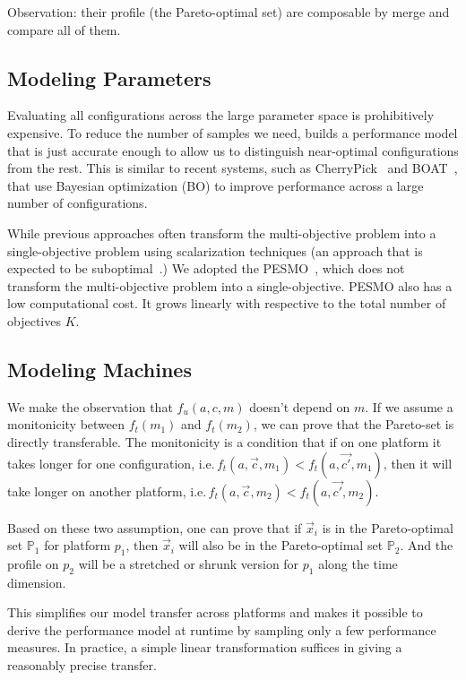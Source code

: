 Observation: their profile (the Pareto-optimal set) are composable by merge and
compare all of them.

\subsection{Modeling Parameters}
\label{sec:single-platform}



Evaluating all configurations across the large parameter space is prohibitively
expensive. To reduce the number of samples we need, \sysname{} builds a
performance model that is just accurate enough to allow us to distinguish
near-optimal configurations from the rest. This is similar to recent systems,
such as CherryPick~\cite{alipourfard2017cherrypick} and
BOAT~\cite{dalibard2017boat}, that use Bayesian optimization (BO) to improve
performance across a large number of configurations.

While previous approaches often transform the multi-objective problem into a
single-objective problem using scalarization techniques (an approach that is
expected to be suboptimal~\cite{knowles2006parego}.) We adopted the
PESMO~\cite{hernandez2016predictive}, which does not transform the
multi-objective problem into a single-objective. PESMO also has a low
computational cost. It grows linearly with respective to the total number of
objectives $K$.

\subsection{Modeling Machines}
\label{sec:performance-transfer}

We make the observation that $f_u(a, c, m)$ doesn't depend on $m$. If we assume
a monitonicity between $f_t(m_1)$ and $f_t(m_2)$, we can prove that the
Pareto-set is directly transferable. The monitonicity is a condition that if on
one platform it takes longer for one configuration,
i.e.\,$f_t(a, \vec{c}, m_1) < f_t(a, \vec{c'}, m_1)$, then it will take longer
on another platform, i.e.\,$f_t(a, \vec{c}, m_2) < f_t(a, \vec{c'}, m_2)$.

Based on these two assumption, one can prove that if $\vec{x}_i$ is in the
Pareto-optimal set $\mathbb{P}_1$ for platform $p_1$, then $\vec{x}_i$ will also
be in the Pareto-optimal set $\mathbb{P}_2$. And the profile on $p_2$ will be a
stretched or shrunk version for $p_1$ along the time dimension.

This simplifies our model transfer across platforms and makes it possible to
derive the performance model at runtime by sampling only a few performance
measures. In practice, a simple linear transformation suffices in giving a
reasonably precise transfer.

